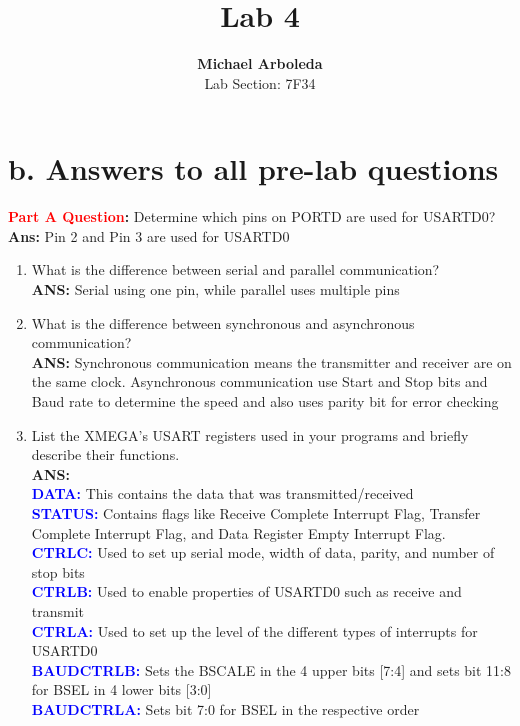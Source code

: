 \documentclass[11pt]{article}
\theoremstyle{plain}
\theoremstyle{definition}
\begin{document}
\captionsetup[figure]{labelfont=bf} 

\title{Lab 4}
\author{\textbf{Michael Arboleda}\\Lab Section: 7F34}
\maketitle
%
%
\section*{b. Answers to all pre-lab questions}

\textbf{\textcolor{red}{Part A Question}:} Determine which pins on PORTD are used for USARTD0?\\
\textbf{Ans: } Pin 2 and Pin 3 are used for USARTD0
\begin{enumerate}[label={\arabic*)},font={\color{red}\bfseries}]
	\item What is the difference between serial and parallel communication?
	\\[0.8ex]
	\textbf{ANS: } Serial using one pin, while parallel uses multiple pins
	\item What is the difference between synchronous and asynchronous communication?
	\\[0.8ex]
	\textbf{ANS: } Synchronous communication means the transmitter and receiver are on the same clock. Asynchronous communication use Start and Stop bits and Baud rate to determine the speed and also uses parity bit for error checking 
	\item List the XMEGA’s USART registers used in your programs and briefly describe their functions.
	\\[0.8ex]
	\textbf{ANS: }\\
	\textbf{\textcolor{blue}{DATA:}} This contains the data that was transmitted/received 
	\\
	\textbf{\textcolor{blue}{STATUS:}} Contains flags like Receive Complete Interrupt Flag, Transfer Complete Interrupt Flag, and Data Register Empty Interrupt Flag. 
	\\
	\textbf{\textcolor{blue}{CTRLC:}} Used to set up serial mode, width of data, parity, and number of stop bits
	\\
	\textbf{\textcolor{blue}{CTRLB:}} Used to enable properties of USARTD0 such as receive and transmit  
	\\
	\textbf{\textcolor{blue}{CTRLA:}}
	Used to set up the level of the different types of interrupts for USARTD0
	\\
	\textbf{\textcolor{blue}{BAUDCTRLB:}} Sets the BSCALE in the 4 upper bits [7:4] and sets bit 11:8 for BSEL in 4 lower bits [3:0]
	\\
	\textbf{\textcolor{blue}{BAUDCTRLA:}} Sets bit 7:0 for BSEL in the respective order
	

\end{enumerate}
\end{document}
